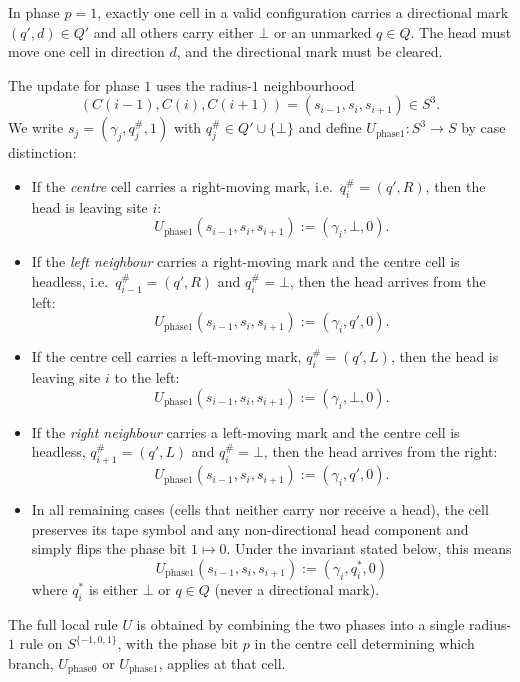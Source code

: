 \documentclass[12pt]{article}
\begin{document}
In phase $p=1$, exactly one cell in a valid configuration carries a directional
mark $(q',d) \in Q'$ and all others carry either $\bot$ or an unmarked $q \in
Q$. The head must move one cell in direction $d$, and the directional mark must
be cleared.

The update for phase $1$ uses the radius-$1$ neighbourhood
\[
(C(i-1), C(i), C(i+1)) = (s_{i-1}, s_i, s_{i+1}) \in S^3.
\]
We write $s_j = (\gamma_j, q_j^\#, 1)$ with $q_j^\# \in Q' \cup \{\bot\}$ and
define $U_{\mathrm{phase1}} : S^3 \to S$ by case distinction:

\begin{itemize}
  \item If the \emph{centre} cell carries a right-moving mark, i.e.~$q_i^\# =
    (q',R)$, then the head is leaving site $i$:
    \[
    U_{\mathrm{phase1}}(s_{i-1}, s_i, s_{i+1}) := (\gamma_i, \bot, 0).
    \]
  \item If the \emph{left neighbour} carries a right-moving mark and the centre
    cell is headless, i.e.~$q_{i-1}^\# = (q',R)$ and $q_i^\# = \bot$, then the
    head arrives from the left:
    \[
    U_{\mathrm{phase1}}(s_{i-1}, s_i, s_{i+1}) := (\gamma_i, q', 0).
    \]
  \item If the centre cell carries a left-moving mark, $q_i^\# = (q',L)$, then
    the head is leaving site $i$ to the left:
    \[
    U_{\mathrm{phase1}}(s_{i-1}, s_i, s_{i+1}) := (\gamma_i, \bot, 0).
    \]
  \item If the \emph{right neighbour} carries a left-moving mark and the centre
    cell is headless, $q_{i+1}^\# = (q',L)$ and $q_i^\# = \bot$, then the head
    arrives from the right:
    \[
    U_{\mathrm{phase1}}(s_{i-1}, s_i, s_{i+1}) := (\gamma_i, q', 0).
    \]
  \item In all remaining cases (cells that neither carry nor receive a head),
    the cell preserves its tape symbol and any non-directional head component
    and simply flips the phase bit $1 \mapsto 0$. Under the invariant stated
    below, this means
    \[
    U_{\mathrm{phase1}}(s_{i-1}, s_i, s_{i+1}) := (\gamma_i, q_i^*, 0)
    \]
    where $q_i^*$ is either $\bot$ or $q \in Q$ (never a directional mark).
\end{itemize}

The full local rule $U$ is obtained by combining the two phases into a single
radius-$1$ rule on $S^{\{-1,0,1\}}$, with the phase bit $p$ in the centre cell
determining which branch, $U_{\mathrm{phase0}}$ or $U_{\mathrm{phase1}}$,
applies at that cell.
\end{document}

